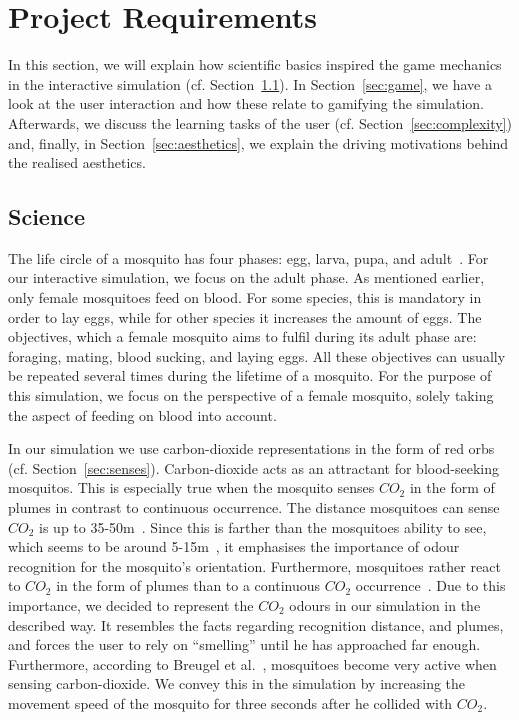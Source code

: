\documentclass{sig-alternate-05-2015}
\begin{document}
\section{Project Requirements}
\label{sec:projectreq}
\noindent
In this section, we will explain how scientific basics inspired the game mechanics in the interactive simulation (cf. Section~\ref{sec:proj_science}). In Section~\ref{sec:game}, we have a look at the user interaction and how these relate to gamifying the simulation. Afterwards, we discuss the learning tasks of the user (cf. Section~\ref{sec:complexity}) and, finally, in Section~\ref{sec:aesthetics}, we explain the driving motivations behind the realised aesthetics.

\subsection{Science}
\label{sec:proj_science}
\noindent
The life circle of a mosquito has four phases: egg, larva, pupa, and adult~\cite{howstuff}. For our interactive simulation, we focus on the adult phase. As mentioned earlier, only female mosquitoes
feed on blood. For some species, this is mandatory in order to lay eggs, while for other species it increases the amount of eggs. The objectives, which a female mosquito aims to fulfil during its adult phase are: foraging, mating, blood sucking, and laying eggs. All these objectives can usually be repeated several times during the lifetime of a mosquito. For the purpose of this simulation, we focus on the perspective of a female mosquito, solely taking the aspect of feeding on blood into account.  

In our simulation we use carbon-dioxide representations in the form of red orbs (cf. Section~\ref{sec:senses}). Carbon-dioxide acts as an attractant for blood-seeking mosquitos. This is especially true when the mosquito senses $CO_2$ in the form of plumes in contrast to continuous occurrence. The distance mosquitoes can sense $CO_2$ is up to 35-50m~\cite{guerenstein2008, breugel2015}. Since this is farther than the mosquitoes ability to see, which seems to be around 5-15m~\cite{breugel2015}, it emphasises the importance of odour recognition for the mosquito's orientation. Furthermore, mosquitoes rather react to $CO_2$ in the form of plumes than to a continuous $CO_2$ occurrence~\cite{guerenstein2008}. Due to this importance, we decided to represent the $CO_2$ odours in our simulation in the described way. It resembles the facts regarding recognition distance, and plumes, and forces the user to rely on ``smelling'' until he has approached far enough. 
Furthermore, according to Breugel et al.~\cite{breugel2015}, mosquitoes become very active when sensing carbon-dioxide. We convey this in the simulation by increasing the movement speed of the mosquito for three seconds after he collided with $CO_2$.
\end{document}
